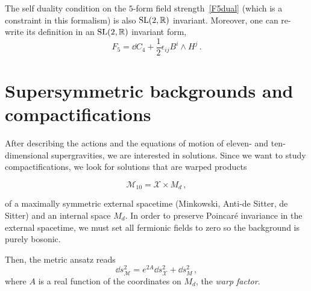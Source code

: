 \documentclass[debug]{phd}
\begin{document}
				The self duality condition on the $5$-form field strength~\eqref{F5dual} (which is a constraint in this formalism) is also $\mathrm{SL}(2,\mathbb{R})$ invariant.
				Moreover, one can re-write its definition in an $\mathrm{SL}(2,\mathbb{R})$ invariant form,
						\begin{equation}
							F_5 = \dd C_4 + \frac{1}{2} \epsilon_{ij} B^i \wedge H^j \, .
						\end{equation}
				
					
	\section{Supersymmetric backgrounds and compactifications}
				After describing the actions and the equations of motion of eleven- and ten-dimensional supergravities, we are interested in solutions.
	 Since we want to study compactifications, we look for solutions that are warped products 
		
			\begin{equation*}
					\mathcal{M}_{10} = \mathcal{X} \times M_d\, ,
				\end{equation*}
				
				of a maximally symmetric external spacetime (Minkowski, Anti-de Sitter, de Sitter) and an internal space $M_d$.
				In order to preserve Poincar\'e invariance in the external spacetime, we must set all fermionic fields to zero so the background is purely bosonic.
				
				Then, the metric ansatz reads
						\begin{equation}\label{metrsplit}
							\dd s^2_{\mathcal{M}} = e^{2A}\dd s^2_{\mathcal{X}} + \dd s^2_{M} \, ,
						\end{equation}
				where $A$ is a real function of the coordinates on $M_d$, the \emph{warp factor}.
					
\end{document}
